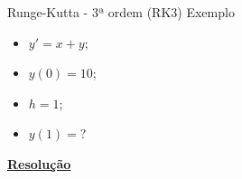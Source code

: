 \documentclass[12pt]{beamer}
\begin{document}
	\begin{frame}{Runge-Kutta - 3ª ordem (RK3)}
		Exemplo
		\begin{itemize}
			\item $y'=x+y$;
			\item $y(0)=10$;
			\item $h=1$;
			\item $y(1)=?$
		\end{itemize}
		\textcolor{red}{\href{https://drive.google.com/file/d/1DxQpVS0yf7EAEhOrTNBwRyE-KH2NNoCE/view?usp=sharing}{\textbf{Resolução}}}
	\end{frame}
\end{document}
